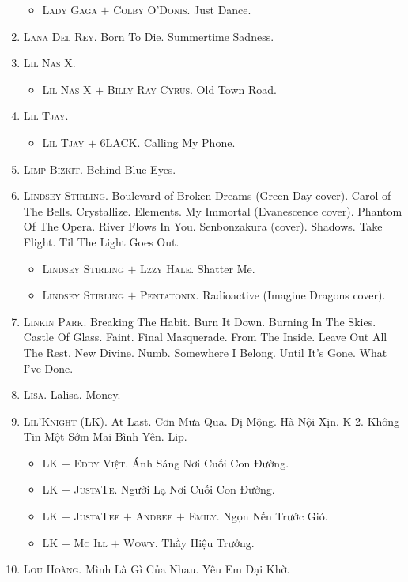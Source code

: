 \documentclass[oneside]{book}
\numberwithin{equation}{section}
\begin{document}
\begin{enumerate}
\begin{itemize}
		\item \textsc{Lady Gaga $+$ Colby O'Donis.} Just Dance.
	\end{itemize}
	\item \textsc{Lana Del Rey.} Born To Die. Summertime Sadness.
	\item \textsc{Lil Nas X.}
	\begin{itemize}
		\item \textsc{Lil Nas X $+$ Billy Ray Cyrus.} Old Town Road.
	\end{itemize}
	\item \textsc{Lil Tjay.}
	\begin{itemize}
		\item \textsc{Lil Tjay $+$ 6LACK.} Calling My Phone.
	\end{itemize}
	\item \textsc{Limp Bizkit.} Behind Blue Eyes.
	\item \textsc{Lindsey Stirling.} Boulevard of Broken Dreams (Green Day cover). Carol of The Bells. Crystallize. Elements. My Immortal (Evanescence cover). Phantom Of The Opera. River Flows In You. Senbonzakura (cover). Shadows. Take Flight. Til The Light Goes Out.
	\begin{itemize}
		\item \textsc{Lindsey Stirling $+$ Lzzy Hale.} Shatter Me.
		\item \textsc{Lindsey Stirling $+$ Pentatonix.} Radioactive (Imagine Dragons cover).
	\end{itemize}
	\item \textsc{Linkin Park.} Breaking The Habit. Burn It Down. Burning In The Skies. Castle Of Glass. Faint. Final Masquerade. From The Inside. Leave Out All The Rest. New Divine. Numb. Somewhere I Belong. Until It's Gone. What I've Done.
	\item \textsc{Lisa.} Lalisa. Money.
	\item \textsc{Lil'Knight (LK).} At Last. Cơn Mưa Qua. Dị Mộng. Hà Nội Xịn. K 2. Không Tin Một Sớm Mai Bình Yên. Lip.
	\begin{itemize}
		\item \textsc{LK $+$ Eddy Việt.} Ánh Sáng Nơi Cuối Con Đường.
		\item \textsc{LK $+$ JustaTe.} Người Lạ Nơi Cuối Con Đường.
		\item \textsc{LK $+$ JustaTee $+$ Andree $+$ Emily.} Ngọn Nến Trước Gió.
		\item \textsc{LK $+$ Mc Ill $+$ Wowy.} Thầy Hiệu Trưởng.
	\end{itemize}
	\item \textsc{Lou Hoàng.} Mình Là Gì Của Nhau. Yêu Em Dại Khờ.

\end{enumerate}
\end{document}
